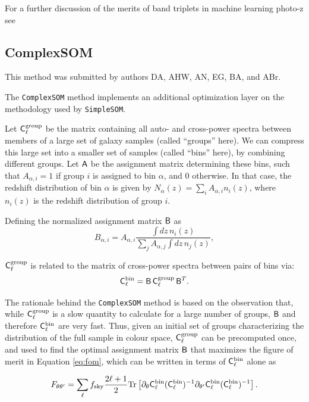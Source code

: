 \documentclass[twocolumn,twocolappendix]{aastex63}
\begin{document}
For a further discussion of the merits of band triplets in machine learning photo-z see \citet{broussard_gawiser}

\subsection{ {\sc ComplexSOM} } \label{sec:csom}
This method was submitted by authors DA, AHW, AN, EG, BA, and ABr.

The {\tt ComplexSOM} method implements an additional optimization layer on the
methodology used by {\tt SimpleSOM}.

Let ${\sf C}^{\rm group}_\ell$ be the matrix containing all auto- and
cross-power spectra between members of a large set of galaxy samples (called
``groups'' here). We can compress this large set into a smaller set of samples
(called ``bins'' here), by combining different groups. Let ${\sf A}$ be the
assignment matrix determining these bins, such that $A_{\alpha,i}=1$ if group
$i$ is assigned to bin $\alpha$, and 0 otherwise. In that case, the redshift
distribution of bin $\alpha$ is given by $N_\alpha(z)=\sum_i
A_{\alpha,i}n_i(z)$, where $n_i(z)$ is the redshift distribution of group $i$.

Defining the normalized assignment matrix ${\sf B}$ as
\begin{equation}
B_{\alpha,i}=A_{\alpha,i}\frac{\int dz\,n_i(z)}{\sum_j A_{\alpha,j}\int dz\,n_j(z)},
\end{equation}

${\sf C}^{\rm group}_\ell$ is related to the matrix of cross-power spectra
between pairs of bins via:
\begin{equation}
{\sf C}^{\rm bin}_\ell={\sf B}\,{\sf C}^{\rm group}_\ell\,{\sf B}^T.
\end{equation}

The rationale behind the {\tt ComplexSOM} method is based on the observation
that, while ${\sf C}^{\rm group}_\ell$ is a slow quantity to calculate for a
large number of groups, ${\sf B}$ and therefore ${\sf C}^{\rm bin}_\ell$ are
very fast. Thus, given an initial set of groups characterizing the
distribution of the full sample in colour space, ${\sf C}^{\rm group}_\ell$
can be precomputed once, and used to find the optimal assignment matrix ${\sf
B}$ that maximizes the figure of merit in Equation \ref{eq:fom},
which can be written in terms of ${\sf C}^{\rm bin}_\ell$ alone as

\begin{equation}\label{eq:fom_tr}
F_{\theta\theta'}=\sum_\ell f_{\rm sky}\frac{2\ell+1}{2}{\rm Tr}\left[\partial_\theta{\sf C}^{\rm bin}_\ell({\sf C}^{\rm bin}_\ell)^{-1}\partial_{\theta'}{\sf C}^{\rm bin}_\ell({\sf C}_\ell^{\rm bin})^{-1}\right].
\end{equation}
\end{document}
